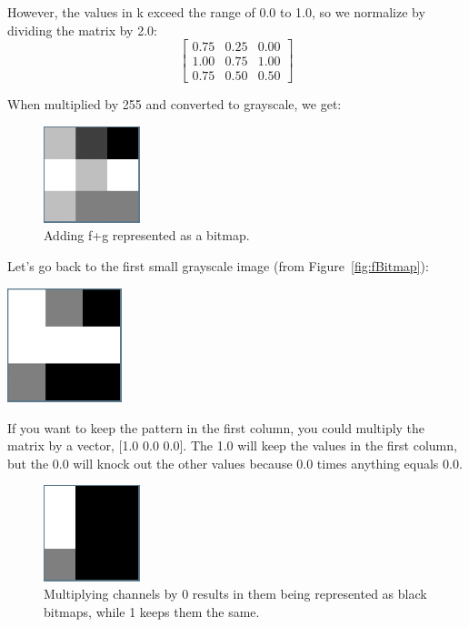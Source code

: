However, the values in k exceed the range of 0.0 to 1.0, so we normalize by 
dividing the matrix by 2.0:
$$\begin{bmatrix}
0.75 & 0.25 & 0.00\\
1.00 & 0.75 & 1.00\\
0.75 & 0.50 & 0.50  
\end{bmatrix}$$

When multiplied by 255 and converted to grayscale, we get:
\begin{figure}[htbp]
    \centering
    \includegraphics[width=0.25\textwidth]{fgBitmapAdded.png}
    \caption{Adding f+g represented as a bitmap.}
    \label{fig:fgBitmapAdded}
\end{figure}

Let's go back to the first small grayscale image (from Figure~\ref{fig:fBitmap}):

\includegraphics[width=0.25\textwidth]{fBitmap.png}

If you want to keep the pattern in the first column, you could multiply the 
matrix by a vector, [1.0 0.0 0.0]. The 1.0 will keep the values in the first 
column, but the 0.0 will knock out the other values because 0.0 times anything 
equals 0.0.
\begin{figure}[htbp]
    \centering
    \includegraphics[width=0.25\textwidth]{onechannel.png}
    \caption{Multiplying channels by 0 results in them being represented as black bitmaps, while 1 keeps them the same.}
    \label{fig:onechannel}
\end{figure}

